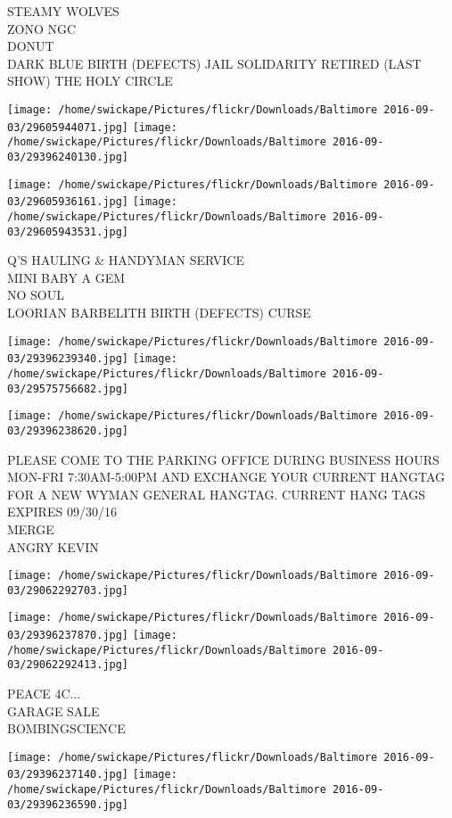 \documentclass[10pt,letterpaper]{article}
\begin{document}
STEAMY WOLVES\\
ZONO NGC\\
DONUT\\
DARK BLUE BIRTH (DEFECTS) JAIL SOLIDARITY RETIRED (LAST SHOW) THE HOLY CIRCLE
\pagebreak

\texttt{[image: /home/swickape/Pictures/flickr/Downloads/Baltimore 2016-09-03/29605944071.jpg]}
\texttt{[image: /home/swickape/Pictures/flickr/Downloads/Baltimore 2016-09-03/29396240130.jpg]}

\texttt{[image: /home/swickape/Pictures/flickr/Downloads/Baltimore 2016-09-03/29605936161.jpg]}
\texttt{[image: /home/swickape/Pictures/flickr/Downloads/Baltimore 2016-09-03/29605943531.jpg]}

Q'S HAULING \& HANDYMAN SERVICE\\
MINI BABY A GEM\\
NO SOUL\\
LOORIAN BARBELITH BIRTH (DEFECTS) CURSE
\pagebreak

\texttt{[image: /home/swickape/Pictures/flickr/Downloads/Baltimore 2016-09-03/29396239340.jpg]}
\texttt{[image: /home/swickape/Pictures/flickr/Downloads/Baltimore 2016-09-03/29575756682.jpg]}

\vspace{0.25in}
\texttt{[image: /home/swickape/Pictures/flickr/Downloads/Baltimore 2016-09-03/29396238620.jpg]}

PLEASE COME TO THE PARKING OFFICE DURING BUSINESS HOURS MON{-}FRI 7:30AM{-}5:00PM AND EXCHANGE YOUR CURRENT HANGTAG FOR A NEW WYMAN GENERAL HANGTAG.  CURRENT HANG TAGS EXPIRES 09/30/16\\
MERGE\\
ANGRY KEVIN
\pagebreak

\texttt{[image: /home/swickape/Pictures/flickr/Downloads/Baltimore 2016-09-03/29062292703.jpg]}

\vspace{0.25in}
\texttt{[image: /home/swickape/Pictures/flickr/Downloads/Baltimore 2016-09-03/29396237870.jpg]}
\texttt{[image: /home/swickape/Pictures/flickr/Downloads/Baltimore 2016-09-03/29062292413.jpg]}

PEACE 4C...\\
GARAGE SALE\\
BOMBINGSCIENCE
\pagebreak

\texttt{[image: /home/swickape/Pictures/flickr/Downloads/Baltimore 2016-09-03/29396237140.jpg]}
\texttt{[image: /home/swickape/Pictures/flickr/Downloads/Baltimore 2016-09-03/29396236590.jpg]}
\end{document}
